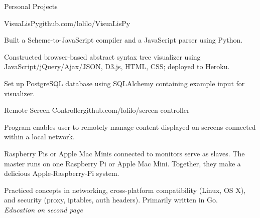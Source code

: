 \documentclass{resume} %
\begin{document}

\begin{rSection}{Personal Projects}


\begin{rSubsection}{VisuaLisPy}{github.com/lolilo/VisuaLisPy}{}{}
\item Built a Scheme-to-JavaScript compiler and a JavaScript parser using Python.
\item Constructed browser-based abstract syntax tree visualizer using JavaScript/jQuery/Ajax/JSON, D3.js, HTML, CSS; deployed to Heroku.
\item Set up PostgreSQL database using SQLAlchemy containing example input for visualizer.
\end{rSubsection}


\begin{rSubsection}{Remote Screen Controller}{github.com/lolilo/screen-controller}{}{}
\item Program enables user to remotely manage content displayed on screens connected within a local network.
\item Raspberry Pis or Apple Mac Minis connected to monitors serve as slaves. The master runs on one Raspberry Pi or Apple Mac Mini. Together, they make a delicious Apple-Raspberry-Pi system.
\item Practiced concepts in networking, cross-platform compatibility (Linux, OS X), and security (proxy, iptables, auth headers). Primarily written in Go. \\



{\em Education on second page}
\end{rSubsection}

\end{rSection}

\end{document}
